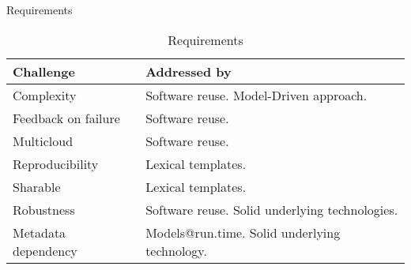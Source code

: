 \begin{table}
    \caption{Requirements}
    \begin{tabular}{ | l | p{} | }
      \hline
      \textbf{Challenge} & \textbf{Addressed by} \\ \hline

      Complexity & Software reuse.
        Model-Driven approach.  \\ \hline

      Feedback on failure & Software reuse. \\ \hline

      Multicloud & Software reuse.  \\ \hline

      Reproducibility & Lexical templates. \\ \hline

      Sharable & Lexical templates. \\ \hline

      Robustness & Software reuse. 
        Solid underlying technologies. \\ \hline

      Metadata dependency & Models@run.time. 
        Solid underlying technology. \\ \hline

    \end{tabular}
  \caption{Requirements}
  \label{table:requirements}
\end{table}

